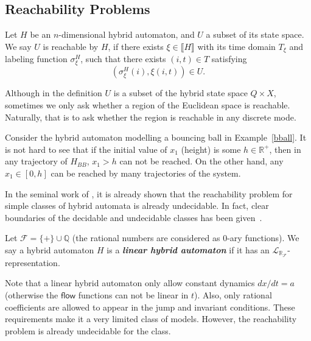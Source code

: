 \documentclass[envcountsect]{llncs}
\newcommand{\flow}{\mathsf{flow}}
\newcommand{\lrf}{\mathcal{L}_{\mathbb{R}_{\mathcal{F}}}}
\begin{document}
\subsection{Reachability Problems}

\begin{definition}[Reachability]\label{reachability}
Let $H$ be an $n$-dimensional hybrid automaton, and $U$ a subset of its state space. We say $U$ is reachable by $H$, if there exists $\xi\in\llbracket H \rrbracket$ with its time domain $T_{\mathcal{\xi}}$ and labeling function $\sigma_{\xi}^H$, such that there exists $(i,t)\in T$ satisfying
$$(\sigma^H_{\xi}(i), \xi(i,t))\in U.$$
\end{definition}

\begin{remark}
Although in the definition $U$ is a subset of the hybrid state space $Q\times X$, sometimes we only ask whether a region of the Euclidean space is reachable. Naturally, that is to ask whether the region is reachable in any discrete mode. 
\end{remark}

\begin{example}
Consider the hybrid automaton modelling a bouncing ball in Example~\ref{bball}. It is not hard to see that if the initial value of $x_1$ (height) is some $h\in \mathbb{R}^+$, then in any trajectory of $H_{BB}$, $x_1> h$ can not be reached. On the other hand, any $x_1\in [0, h]$ can be reached by many trajectories of the system. 
\end{example}

In the seminal work of \cite{DBLP:conf/rex/AlurD91,DBLP:conf/hybrid/AlurCHH92}, it is already shown that the reachability problem for simple classes of hybrid automata is already undecidable. In fact, clear boundaries of the decidable and undecidable classes has been given~\cite{DBLP:journals/jcss/HenzingerKPV98}.

\begin{definition}
Let $\mathcal{F} = \{+\}\cup \mathbb{Q}$ (the rational numbers are considered as 0-ary functions). We say a hybrid automaton $H$ is a {\bf\em linear hybrid automaton} if it has an $\lrf$-representation. 
\end{definition}

Note that a linear hybrid automaton only allow constant dynamics $dx/dt = a$ (otherwise the $\flow$ functions can not be linear in $t$). Also, only rational coefficients are allowed to appear in the jump and invariant conditions. These requirements make it a very limited class of models. However, the reachability problem is already undecidable for the class. 
\end{document}

